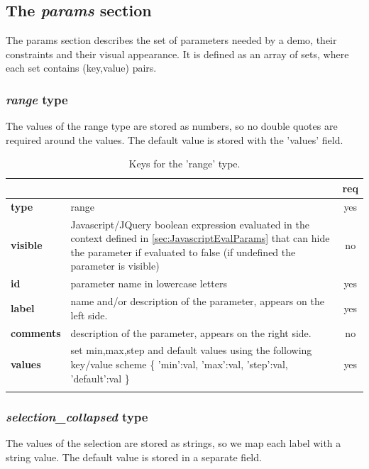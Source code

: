 \subsection{The \emph{params} section}
The params section describes the set of parameters needed by a demo, their 
constraints and their visual appearance. It is defined as an array of sets, 
where each set contains (key,value) pairs.


\subsubsection{ \emph{range} type}

The values of the range type are stored as numbers, so no double quotes are 
required around the values. The default value is stored with the 'values' field.

\begin{longtable}{|>{\bf}L{\linewidth}|L{\linewidth}|c|}
\hline
      &  & {\bf req} 
\tabularnewline \hline \hline
 type  & range       & yes \\ \hline
 visible  & Javascript/JQuery boolean expression evaluated in the context defined 
              in \ref{sec:JavascriptEvalParams} that can hide the parameter if
            evaluated to false (if undefined the parameter is visible)& no \\ \hline
 id     & parameter name in lowercase letters  & yes \\ \hline
 label  & name and/or description of the parameter, appears on the left side. & yes
                      \\ \hline
 comments & description of the parameter, appears on the right side. & no
                      \\ \hline
 values & set min,max,step and default values using the following key/value 
scheme \{ 'min':val, 'max':val, 'step':val, 'default':val \} & yes
                      \\ \hline
\caption{Keys for the 'range' type.}
\end{longtable}


\subsubsection{ \emph{selection\_collapsed} type}

The values of the selection are stored as strings, so we map each label with a 
string value. The default value is stored in a separate field.

